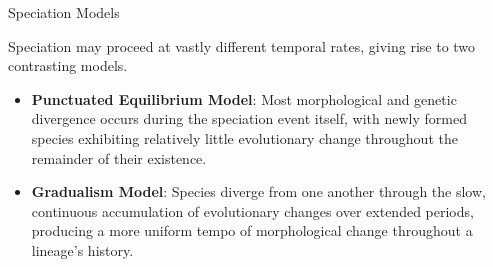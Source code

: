 \documentclass[10pt]{article}
\begin{document}
    \begin{core}{Speciation Models}

      Speciation may proceed at vastly different temporal rates, giving rise to two contrasting models.

      \begin{itemize}

        \item \textbf{Punctuated Equilibrium Model}: Most morphological and genetic divergence occurs during the speciation event itself, with newly formed species exhibiting relatively little evolutionary change throughout the remainder of their existence.


        \item \textbf{Gradualism Model}: Species diverge from one another through the slow, continuous accumulation of evolutionary changes over extended periods, producing a more uniform tempo of morphological change throughout a lineage's history.


      \end{itemize}

    \end{core}
  
\end{document}
